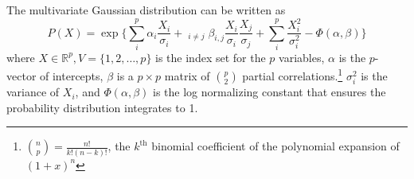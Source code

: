 The multivariate Gaussian distribution can be written as
\begin{equation} \label{multiGauss}
    P(X) = \exp\Bigg\{\sum_i^p \alpha_i \frac{X_i}{\sigma_i} + \mathop{\sum_{i,j \in V}}_{i \neq j} \beta_{i,j} \frac{X_i}{\sigma_i} \frac{X_j}{\sigma_j} + \sum_i^p \frac{X_i^2}{\sigma_i^2} - \Phi(\alpha,\beta)\Bigg\}
\end{equation}
where $X \in \mathbb{R}^p,V=\{1,2,\ldots,p\}$ is the index set for the $p$ variables, $\alpha$ is the $p$-vector of intercepts, $\beta$ is a $p \times p$ matrix of $\binom{p}{2}$ partial correlations.\footnote{$\binom{n}{p} = \frac{n!}{k!(n-k)!}$, the $k^{\text{th}}$ binomial coefficient of the polynomial expansion of $(1+x)^n$} $\sigma_i^2$ is the variance of $X_i$, and $\Phi(\alpha,\beta)$ is the log normalizing constant that ensures the probability distribution integrates to 1.

